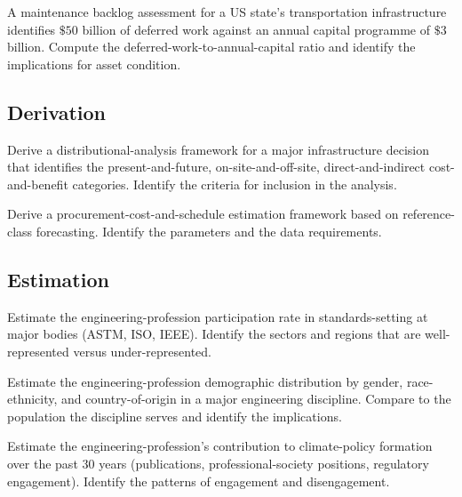 \begin{exercise}
A maintenance backlog assessment for a US state's transportation infrastructure identifies $\$50$ billion of deferred work against an annual capital programme of $\$3$ billion. Compute the deferred-work-to-annual-capital ratio and identify the implications for asset condition.
\end{exercise}

\subsection*{Derivation}

\begin{exercise}
Derive a distributional-analysis framework for a major infrastructure decision that identifies the present-and-future, on-site-and-off-site, direct-and-indirect cost-and-benefit categories. Identify the criteria for inclusion in the analysis.
\end{exercise}

\begin{exercise}
Derive a procurement-cost-and-schedule estimation framework based on reference-class forecasting. Identify the parameters and the data requirements.
\end{exercise}

\subsection*{Estimation}

\begin{exercise}
Estimate the engineering-profession participation rate in standards-setting at major bodies (ASTM, ISO, IEEE). Identify the sectors and regions that are well-represented versus under-represented.
\end{exercise}

\begin{exercise}
Estimate the engineering-profession demographic distribution by gender, race-ethnicity, and country-of-origin in a major engineering discipline. Compare to the population the discipline serves and identify the implications.
\end{exercise}

\begin{exercise}
Estimate the engineering-profession's contribution to climate-policy formation over the past $30$ years (publications, professional-society positions, regulatory engagement). Identify the patterns of engagement and disengagement.
\end{exercise}

